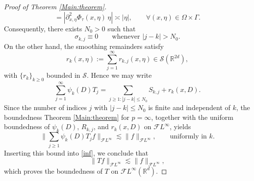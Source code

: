 \documentclass[12pt, reqno]{amsart}
\theoremstyle{definition}
\theoremstyle{remark}
\numberwithin{equation}{section}
\begin{document}
\begin{proof}[Proof of Theorem \ref{Main:theorem}]
\[=|\partial^2_{x,\eta}\Phi_\tau(x,\eta)\,\eta|
\asymp|\eta|,
\qquad \forall(x,\eta)\in\Omega \times\Gamma.
\]
Consequently, there exists $N_0>0$ such that
\[
\sigma_{k,j}\equiv0
\qquad\text{whenever } |j-k|>N_0.
\]
On the other hand, the smoothing remainders satisfy
\[
r_k(x,\eta):=\sum_{j=1}^\infty r_{k,j}(x,\eta)\in\mathcal{S}(\mathbb{R}^{2d}),
\]
with $\{r_k\}_{k\ge0}$ bounded in $\mathcal{S}$.
Hence we may write
\[
\sum_{j=1}^\infty\psi_k(D)T_j
=
\sum_{j\ge 1:|j-k|\le N_0} S_{k,j}+r_k(x,D).
\]
Since the number of indices $j$ with $|j-k|\le N_0$ is finite and independent of $k$, the boundedness Theorem \ref{Main:theorem}
for $p=\infty$, together with the uniform boundedness of
$\psi_k(D)$, $R_{k,j}$, and $r_k(x,D)$ on $\mathcal{F}L^\infty$, yields
\[
\Big\|\sum_{j\ge1}\psi_k(D)T_jf\Big\|_{\mathcal{F}L^\infty}
\lesssim
\|f\|_{\mathcal{F}L^\infty},
\qquad \text{uniformly in } k.
\]
Inserting this bound into \eqref{inf}, we conclude that
\[
\|Tf\|_{\mathcal{F}L^\infty}
\lesssim
\|f\|_{\mathcal{F}L^\infty},
\]
which proves the boundedness of $T$ on $\mathcal{F}L^\infty(\mathbb{R}^d)$.



\end{proof}
\end{document}
